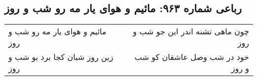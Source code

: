 \begin{center}
\section*{رباعی شماره ۹۶۳: مائیم و هوای یار مه رو شب و روز}
\label{sec:0963}
\begin{longtable}{l p{0.5cm} r}
مائیم و هوای یار مه رو شب و روز
&&
چون ماهی تشنه اندر این جو شب و روز
\\
زین روز شبان کجا برد بو شب و روز
&&
خود در شب وصل عاشقان کو شب و روز
\\
\end{longtable}
\end{center}
